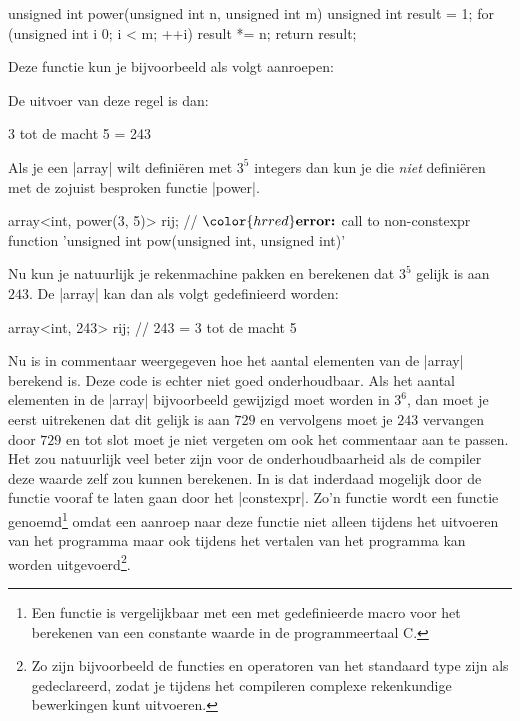 \begin{cpplstShortInline}
\begin{cpplstfragment}
unsigned int power(unsigned int n, unsigned int m) {
	unsigned int result = 1;
	for (unsigned int i {0}; i < m; ++i) {
		result *= n;
	}
	return result;
}
\end{cpplstfragment}

Deze functie kun je bijvoorbeeld als volgt aanroepen:


De uitvoer van deze regel is dan:

\begin{coutput}
3 tot de macht 5 = 243
\end{coutput}

Als je een |array| wilt definiëren met $3^5$ integers dan kun je die \emph{niet} definiëren met de zojuist besproken functie |power|.

\begin{cpplstfragment}[mathescape=true]
	array<int, power(3, 5)> rij;
//  $\color{hrred}\textbf{error:}$ call to non-constexpr function 'unsigned int pow(unsigned int, unsigned int)'
\end{cpplstfragment}

Nu kun je natuurlijk je rekenmachine pakken en berekenen dat $3^5$ gelijk is aan $243$. De |array| kan dan als volgt gedefinieerd worden:

\begin{cpplstfragment}
	array<int, 243> rij; // 243 = 3 tot de macht 5
\end{cpplstfragment}

Nu is in commentaar weergegeven hoe het aantal elementen van de |array| berekend is. 
Deze code is echter niet goed onderhoudbaar. 
Als het aantal elementen in de |array| bijvoorbeeld gewijzigd moet worden in $3^6$, dan moet je eerst uitrekenen dat dit gelijk is aan $729$ en vervolgens moet je $243$ vervangen door $729$ en tot slot moet je niet vergeten om ook het commentaar aan te passen. 
Het zou natuurlijk veel beter zijn voor de onderhoudbaarheid als de compiler deze waarde zelf zou kunnen berekenen. 
In \Cpp{} is dat inderdaad mogelijk door de functie vooraf te laten gaan door het  |constexpr|. 
Zo'n functie wordt een  functie genoemd\footnote{%
	Een  functie is vergelijkbaar met een met  gedefinieerde macro voor het berekenen van een constante waarde in de programmeertaal C.
} omdat een aanroep naar deze functie niet alleen tijdens het uitvoeren van het programma maar ook tijdens het vertalen van het programma kan worden uitgevoerd\footnote{%
	Zo zijn bijvoorbeeld de functies en operatoren van het standaard type  zijn als  gedeclareerd, zodat je tijdens het compileren complexe rekenkundige bewerkingen kunt uitvoeren.
}. 


\end{cpplstShortInline}
